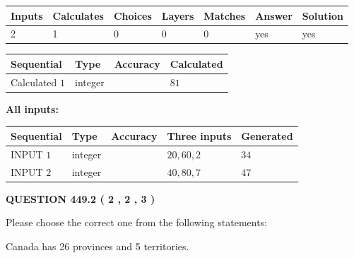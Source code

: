 \documentclass[12pt]{article}
\begin{document}
 

 
   
   
   
   
\noindent\begin{tabular}{|l|l|l|l|l|l|l|}
 \hline
Inputs & Calculates & Choices & Layers & Matches & Answer & Solution \\ \hline
 2  & 
 1  & 
 0
  & 
 0  & 
 0  & 
  yes & 
  yes 
  \\ \hline
 \end{tabular}
   
   
   
   
\noindent{}
   
   
  
  
\noindent\begin{tabular}{|l|l|l|l|}
\hline
 Sequential & Type & Accuracy & Calculated \\ 
\hline
 
 
  Calculated $  1 $ & integer &  & 
  $ 81 $ 
 \\  \hline  
 \end{tabular}
   
   
   
   
\noindent\vspace{0.1in}\hspace{-0.08in} {\textbf{\Large{All inputs: }}}
   
   
  
  
\noindent\begin{tabular}{|l|l|l|l|l|}
\hline
 Sequential & Type & Accuracy & Three inputs & Generated \\ 
\hline
 
 
  INPUT $  1 $ & integer &  & $
 20
 , 
 60
 , 
 2
 $ & $ 34 $ 
 \\  \hline  
 
 
  INPUT $  2 $ & integer &  & $
 40
 , 
 80
 , 
 7
 $ & $ 47 $ 
 \\  \hline  
 \end{tabular}
   
   
  
\vspace{0.2in}
  
{\textbf{\Large{QUESTION
449.2 
 ( 2 , 2 , 3 )
}}}
  
  
Please choose the correct one from the following statements:
 
 
Canada has  26 provinces and  5 territories.
 
\end{document}
